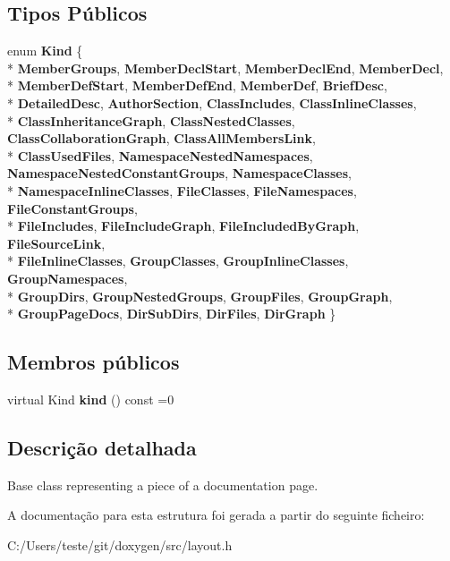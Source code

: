 \subsection*{Tipos Públicos}
\begin{DoxyCompactItemize}
\item 
enum {\bfseries Kind} \{ \\*
{\bfseries Member\-Groups}, 
{\bfseries Member\-Decl\-Start}, 
{\bfseries Member\-Decl\-End}, 
{\bfseries Member\-Decl}, 
\\*
{\bfseries Member\-Def\-Start}, 
{\bfseries Member\-Def\-End}, 
{\bfseries Member\-Def}, 
{\bfseries Brief\-Desc}, 
\\*
{\bfseries Detailed\-Desc}, 
{\bfseries Author\-Section}, 
{\bfseries Class\-Includes}, 
{\bfseries Class\-Inline\-Classes}, 
\\*
{\bfseries Class\-Inheritance\-Graph}, 
{\bfseries Class\-Nested\-Classes}, 
{\bfseries Class\-Collaboration\-Graph}, 
{\bfseries Class\-All\-Members\-Link}, 
\\*
{\bfseries Class\-Used\-Files}, 
{\bfseries Namespace\-Nested\-Namespaces}, 
{\bfseries Namespace\-Nested\-Constant\-Groups}, 
{\bfseries Namespace\-Classes}, 
\\*
{\bfseries Namespace\-Inline\-Classes}, 
{\bfseries File\-Classes}, 
{\bfseries File\-Namespaces}, 
{\bfseries File\-Constant\-Groups}, 
\\*
{\bfseries File\-Includes}, 
{\bfseries File\-Include\-Graph}, 
{\bfseries File\-Included\-By\-Graph}, 
{\bfseries File\-Source\-Link}, 
\\*
{\bfseries File\-Inline\-Classes}, 
{\bfseries Group\-Classes}, 
{\bfseries Group\-Inline\-Classes}, 
{\bfseries Group\-Namespaces}, 
\\*
{\bfseries Group\-Dirs}, 
{\bfseries Group\-Nested\-Groups}, 
{\bfseries Group\-Files}, 
{\bfseries Group\-Graph}, 
\\*
{\bfseries Group\-Page\-Docs}, 
{\bfseries Dir\-Sub\-Dirs}, 
{\bfseries Dir\-Files}, 
{\bfseries Dir\-Graph}
 \}
\end{DoxyCompactItemize}
\subsection*{Membros públicos}
\begin{DoxyCompactItemize}
\item 
\hypertarget{struct_layout_doc_entry_a27e5d1dde6c9e861b52afa5a95f71d2d}{virtual Kind {\bfseries kind} () const =0}\label{struct_layout_doc_entry_a27e5d1dde6c9e861b52afa5a95f71d2d}

\end{DoxyCompactItemize}


\subsection{Descrição detalhada}
Base class representing a piece of a documentation page. 

A documentação para esta estrutura foi gerada a partir do seguinte ficheiro\-:\begin{DoxyCompactItemize}
\item 
C\-:/\-Users/teste/git/doxygen/src/layout.\-h\end{DoxyCompactItemize}
